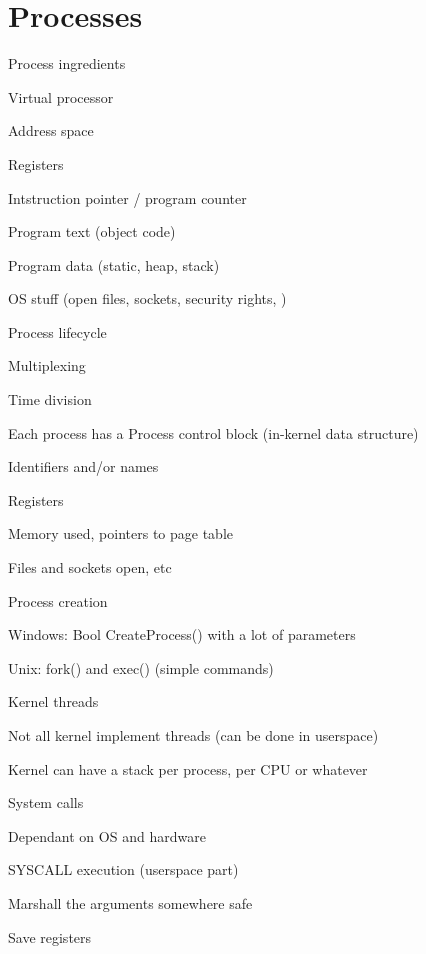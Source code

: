 \section{Processes}
\enumstart
	\item Process ingredients
	\enumstart
		\item Virtual processor
		\enumstart
			\item Address space
			\item Registers
			\item Intstruction pointer / program counter
		\enumend
		\item Program text (object code)
		\item Program data (static, heap, stack)
		\item OS stuff (open files, sockets, security rights, \ddd)
	\enumend
	\item Process lifecycle
	\\ 
	\item Multiplexing
	\enumstart
		\item Time division
		\item Each process has a Process control block (in-kernel data structure)
		\enumstart
			\item Identifiers and/or names
			\item Registers
			\item Memory used, pointers to page table
			\item Files and sockets open, etc
		\enumend
	\enumend
	\item Process creation
	\enumstart
		\item Windows: Bool CreateProcess(\ddd) with a lot of parameters
		\item Unix: fork() and exec() (simple commands)
		\\ 
	\enumend
	\item Kernel threads
	\enumstart
		\item Not all kernel implement threads (can be done in userspace)
		\item Kernel can have a stack per process, per CPU or whatever
	\enumend
	\item System calls
	\enumstart
		\item Dependant on OS and hardware
		\item SYSCALL execution (userspace part)
		\enumstart
			\item Marshall the arguments somewhere safe
			\item Save registers
